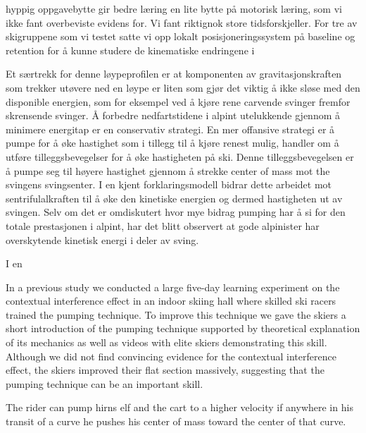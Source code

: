 \documentclass{article}
\begin{document}
hyppig oppgavebytte gir bedre læring en lite bytte på motorisk læring, som vi ikke fant overbeviste evidens for. Vi fant riktignok store tidsforskjeller. For tre av skigruppene som vi testet satte vi opp lokalt posisjoneringssystem på baseline og retention for å kunne studere de kinematiske endringene i


 


Et særtrekk for denne løypeprofilen er at komponenten av gravitasjonskraften som trekker utøvere ned en løype er liten som gjør det viktig å ikke sløse med den disponible energien, som for eksempel ved å kjøre rene carvende svinger fremfor skrensende svinger. Å forbedre nedfartstidene i alpint utelukkende gjennom å minimere energitap er en conservativ strategi. En mer offansive strategi er å pumpe for å øke hastighet som i tillegg til å kjøre renest mulig, handler om å utføre tilleggsbevegelser for å øke hastigheten på ski. Denne tilleggsbevegelsen er å pumpe seg til høyere hastighet gjennom å strekke center of mass mot the svingens svingsenter. I en kjent forklaringsmodell bidrar dette arbeidet mot sentrifulalkraften til å øke den kinetiske energien og dermed hastigheten ut av svingen. Selv om det er omdiskutert hvor mye bidrag pumping har å si for den totale prestasjonen i alpint, har det blitt observert at gode alpinister har overskytende kinetisk energi i deler av sving. 

I en 

In a previous study we conducted a large five-day learning experiment on the contextual interference effect in an indoor skiing hall where skilled ski racers trained the pumping technique. To improve this technique we gave the skiers a short introduction of the pumping technique supported by theoretical explanation of its mechanics as well as videos with elite skiers demonstrating this skill. Although we did not find convincing evidence for the contextual interference effect, the skiers improved their flat section massively, suggesting that the pumping technique can be an important skill.













The rider can pump hirns elf and the
cart to a higher velocity if anywhere in his transit of a curve he pushes
his center of mass toward the center of that curve.
\end{document}
